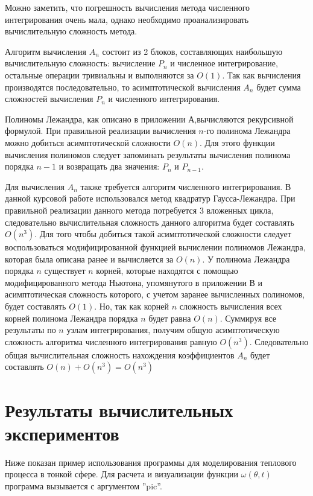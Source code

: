{{Можно заметить, что погрешность вычисления метода численного интегрирования очень мала, однако необходимо проанализировать вычислительную сложность метода. 

Алгоритм вычисления $A_n$ состоит из 2 блоков, составляющих наибольшую вычислительную сложность: вычисление $P_n$ и численное интегрирование, 
остальные операции тривиальны и выполняются за $O(1)$. Так как вычисления производятся последовательно,
то асимптотической вычисления $A_n$ будет сумма сложностей вычисления $P_n$ и численного интегрирования. 

Полиномы Лежандра, как описано в приложении А,вычисляются рекурсивной формулой.
При правильной реализации вычисления $n$-го полинома Лежандра можно добиться асимптотической сложности $O(n)$. 
Для этого функции вычисления полиномов следует запоминать результаты вычисления полинома порядка $n-1$ и возвращать два значения: $P_n$ и $P_{n-1}$.

Для вычисления $A_n$ также требуется алгоритм численного интегрирования. В данной курсовой работе использовался метод квадратур Гаусса-Лежандра.
При правильной реализации данного метода потребуется 3 вложенных цикла, следовательно вычислительная сложность данного алгоритма будет составлять $O(n^3)$.
Для того чтобы добиться такой асимптотической сложности следует воспользоваться модифицированной функцией вычислении полиномов Лежандра, которая была 
описана ранее и вычисляется за $O(n)$. У полинома Лежандра порядка $n$ существует $n$ корней, которые находятся с помощью модифицированного метода Ньютона, 
упомянутого в приложении В и асимптотическая сложность которого, с учетом заранее вычисленных полиномов, будет составлять $O(1)$. Но, так как корней 
$n$ сложность вычисления всех корней полинома Лежандра порядка $n$ будет равна $O(n)$. Суммируя все результаты по $n$ узлам интегрирования, получим
общую асимптотическую сложность алгоритма численного интегрирования равную $O(n^3)$. 
Следовательно общая вычислительная сложность нахождения коэффициентов $A_n$ будет составлять $O(n) + O(n^3) = O(n^3)$

}


\newpage
\section{Результаты вычислительных экспериментов}
{

Ниже показан пример использования программы для моделирования теплового процесса в тонкой сфере.
Для расчета и визуализации функции $\omega(\theta,t)$ программа вызывается с аргументом ''pic''.

}}
